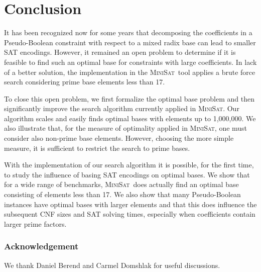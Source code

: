 \documentclass[envcountsame]{llncs}
\newcommand\minisatp{\textsc{MiniSat}}
\begin{document}
\section{Conclusion}
\label{sec:conc}

It has been recognized now for some years that decomposing the
coefficients in a Pseudo-Boolean constraint with respect to a mixed
radix base can lead to smaller SAT encodings. However, it remained an
open problem to determine if it is feasible to find such an optimal
base for constraints with large coefficients. In lack of a better
solution, the implementation in the \minisatp\ tool applies a brute
force search considering prime base elements less than 17.



To close this open problem, we first formalize the optimal base
problem and then significantly improve the search algorithm currently
applied in \minisatp.
Our algorithm scales and easily finds optimal bases
with elements up to 1,000,000.
We also illustrate that, for the
measure of optimality applied in \minisatp, one must consider also
non-prime base elements. However, choosing the more simple
 measure, it is sufficient to restrict the search to prime
bases.

With the implementation of our search algorithm it is possible, for
the first time, to study the influence of basing SAT encodings on
optimal bases.  We show that for a wide range of benchmarks,
\minisatp\ does actually find an optimal base consisting of elements
less than 17.  We also show that many Pseudo-Boolean instances have
optimal bases with larger elements and that this does influence the
subsequent CNF sizes and SAT solving times, especially when
coefficients contain larger prime factors.



\vspace{-2ex}

\subsubsection*{Acknowledgement}
We thank Daniel Berend and Carmel Domshlak for useful discussions.

\vspace{-2ex}
\end{document}
